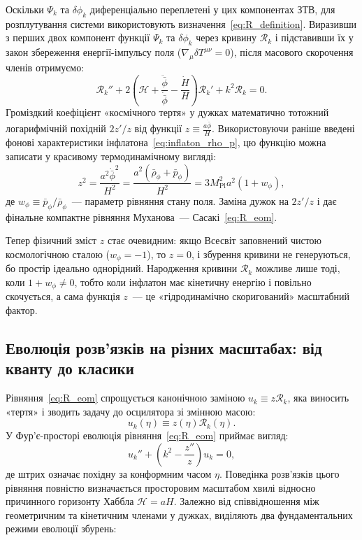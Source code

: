 \begin{mathbox}
    Оскільки $\Psi_k$ та $\delta\phi_k$ диференціально переплетені у цих компонентах ЗТВ, для розплутування системи
    використовують визначення~\eqref{eq:R_definition}. Виразивши з перших двох компонент функції $\Psi_k$ та $\delta\phi_k$
    через кривину $\mathcal{R}_k$ і підставивши їх у закон збереження енергії-імпульсу поля ($\nabla_\mu \delta T^{\mu\nu}=0$),
    після масового скорочення членів отримуємо:
    \begin{equation*}
      \mathcal{R}_k'' + 2\left(\mathcal{H} + \frac{\ddot{\bar\phi}}{\dot{\bar\phi}} - \frac{\dot{H}}{H}\right)\mathcal{R}_k' + k^2\mathcal{R}_k = 0.
    \end{equation*}
    Громіздкий коефіцієнт «космічного тертя» у дужках математично тотожний логарифмічній похідній $2z'/z$ від функції
    $z \equiv \frac{a\dot{\bar\phi}}{H}$. Використовуючи раніше введені фонові характеристики інфлатона~\eqref{eq:inflaton_rho_p},
    цю функцію можна записати у красивому термодинамічному вигляді:
    \begin{equation*}
       z^2 = \frac{a^2 \dot{\bar{\phi}}^2}{H^2} = \frac{a^2 (\bar{\rho}_\phi + \bar{p}_\phi)}{H^2} = 3 M_{\mathrm{Pl}}^2 a^2 (1 + w_\phi),
    \end{equation*}
    де $w_\phi \equiv \bar{p}_\phi / \bar{\rho}_\phi$~--- параметр рівняння стану поля. Заміна дужок на $2z'/z$ і дає
    фінальне компактне рівняння Муханова~--- Сасакі~\eqref{eq:R_eom}.

    Тепер фізичний зміст $z$ стає очевидним: якщо Всесвіт заповнений чистою космологічною сталою ($w_\phi = -1$), то $z = 0$, і збурення кривини не генеруються, бо простір ідеально однорідний. Народження кривини $\mathcal{R}_k$ можливе лише тоді, коли $1 + w_\phi \neq 0$, тобто коли інфлатон має кінетичну енергію і повільно скочується, а сама функція $z$~--- це «гідродинамічно скоригований» масштабний фактор.
\end{mathbox}


\subsection*{Еволюція розв'язків на різних масштабах: від кванту до класики}

Рівняння~\eqref{eq:R_eom} спрощується канонічною заміною
$u_k \equiv z\mathcal{R}_k$, яка виносить «тертя» і зводить
задачу до осцилятора зі змінною масою:
\begin{equation}\label{eq:u_definition}
  u_k(\eta) \equiv z(\eta) \mathcal{R}_k(\eta).
\end{equation}
У Фур'є-просторі еволюція рівняння~\eqref{eq:R_eom} приймає вигляд:
\begin{equation}\label{eq:R_eom_u}
  u_k'' + \left( k^2 - \frac{z''}{z} \right) u_k = 0,
\end{equation}
де штрих означає похідну за конформним часом $\eta$. Поведінка розв'язків цього рівняння повністю визначається просторовим масштабом хвилі відносно причинного горизонту Хаббла $\mathcal{H} = aH$. Залежно від співвідношення між геометричним та кінетичним членами у дужках, виділяють два фундаментальних режими еволюції збурень:


